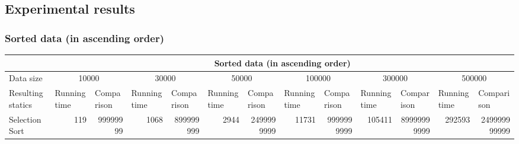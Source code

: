 \documentclass{article}
\begin{document}
\subsection{Experimental results}
\subsubsection{Sorted data (in ascending order)}
\begin{table}[H]
\begin{adjustbox}{width=\columnwidth,center}
\begin{tabular}{|l|rrrrrrrrrrrr|}
\hline
                                   & \multicolumn{12}{c|}{Sorted data (in ascending order)}                                                                                                                                                                                                                                                                                                                                                                             \\ \hline
Data size                          & \multicolumn{2}{c|}{10000}                                          & \multicolumn{2}{c|}{30000}                                          & \multicolumn{2}{c|}{50000}                                          & \multicolumn{2}{c|}{100000}                                         & \multicolumn{2}{c|}{300000}                                          & \multicolumn{2}{c|}{500000}                                         \\ \hline
Resulting statics                  & \multicolumn{1}{l|}{Running time} & \multicolumn{1}{l|}{Comparison} & \multicolumn{1}{l|}{Running time} & \multicolumn{1}{l|}{Comparison} & \multicolumn{1}{l|}{Running time} & \multicolumn{1}{l|}{Comparison} & \multicolumn{1}{l|}{Running time} & \multicolumn{1}{l|}{Comparison} & \multicolumn{1}{l|}{Running time} & \multicolumn{1}{l|}{Comparison}  & \multicolumn{1}{l|}{Running time} & \multicolumn{1}{l|}{Comparison} \\ \hline
Selection Sort                     & \multicolumn{1}{r|}{119}          & \multicolumn{1}{r|}{99999999}   & \multicolumn{1}{r|}{1068}         & \multicolumn{1}{r|}{899999999}  & \multicolumn{1}{r|}{2944}         & \multicolumn{1}{r|}{2499999999} & \multicolumn{1}{r|}{11731}        & \multicolumn{1}{r|}{9999999999} & \multicolumn{1}{r|}{105411}       & \multicolumn{1}{r|}{89999999999} & \multicolumn{1}{r|}{292593}       & 249999999999                    \\ \hline

\end{tabular}
\end{adjustbox}
\end{table}
\end{document}
